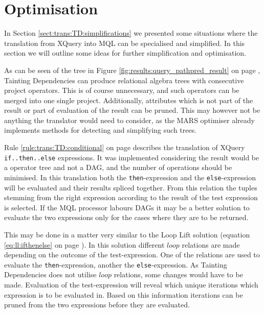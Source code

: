 \section{Optimisation}
\label{sect:disc:optimisations}

In Section \ref{sect:trans:TD:simplifications} we presented some situations where the translation from XQuery into
MQL can be specialised and simplified. In this section we will outline some ideas for further simplification and
optimisation.

As can be seen of the tree in Figure \ref{fig:results:query_pathpred_result} on page
\pageref{fig:results:query_pathpred_result}, Tainting Dependencies can produce
relational algebra trees with consecutive \textsf{project} operators. This is of course unnecessary, and such
operators can be merged into one single \textsf{project}. Additionally, attributes which is not part of the result
or part of evaluation of the result can be pruned. This may however not be anything the translator would need to
consider, as the MARS optimiser already implements methods for detecting and simplifying such trees.

Rule \ref{rule:trans:TD:conditional} on page \pageref{rule:trans:TD:conditional} describes the translation of
XQuery \texttt{if..then..else} expressions. It was implemented considering the result would be a operator tree and
not a DAG, and the number of operations should be minimised. In this translation both the \texttt{then}-expression
and the \texttt{else}-expression will be evaluated and their results spliced together. From this relation the
tuples stemming from the right expression according to the result of the test expression is selected. If the MQL
processor labours DAGs it may be a better solution to evaluate the two expressions only for the cases where they
are to be returned. 

This may be done in a matter very similar to the Loop Lift solution (equation
\ref{eq:ll:ifthenelse} on page \pageref{eq:ll:ifthenelse}). In this solution different $loop$ relations are made
depending on the outcome of the test-expression. One of the relations are used to evaluate the
\texttt{then}-expression, another the \texttt{else}-expression. As Tainting Dependencies does not utilise $loop$
relations, some changes would have to be made. Evaluation of the test-expression will reveal which unique
iterations which expression is to be evaluated in. Based on this information iterations can be pruned from the two
expressions before they are evaluated.

